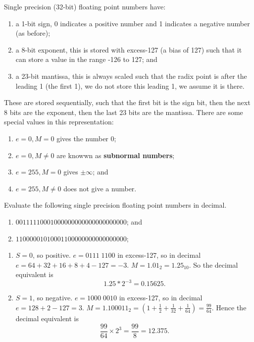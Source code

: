 \begin{definition}
    Single precision (32-bit) floating point numbers have:
    \begin{enumerate}
        \item a 1-bit sign, 0 indicates a positive number and 1 indicates a negative number (as before);
        \item a 8-bit exponent, this is stored with excess-127 (a bias of 127) such that it can store a value in the range -126 to 127; and
        \item a 23-bit mantissa, this is always scaled such that the radix point is after the leading 1 (the first 1), we do not store this leading 1, we assume it is there.
    \end{enumerate}
    These are stored sequentially, such that the first bit is the sign bit, then the next 8 bits are the exponent, then the last 23 bits are the mantissa. There are some special values in this representation:
    \begin{enumerate}
        \item $e = 0, M = 0$ gives the number 0;
        \item $e = 0, M \neq 0$ are knowwn as \textbf{subnormal numbers};
        \item $e = 255, M = 0$ gives $\pm \infty$; and
        \item $e = 255, M \neq 0$ does not give a number.
    \end{enumerate}
\end{definition}

\begin{example}
    Evaluate the following single precision floating point numbers in decimal.
    \begin{enumerate}
        \item $00111110001000000000000000000000$; and
        \item $11000001010001100000000000000000$;
    \end{enumerate}
\end{example}

\begin{solution}
    \begin{enumerate}
        \item $S = 0$, so positive. $e = 0111 \; 1100$ in excess-127, so in decimal $e = 64 + 32 + 16 + 8 + 4 - 127 = -3$. $M = 1.01_2 = 1.25_{10}$. So the decimal equivalent is \[ 1.25 * 2^{-3} = 0.15625. \]
        \item $S = 1$, so negative. $e = 1000 \; 0010$ in excess-127, so in decimal $e = 128 + 2 - 127 = 3$. $M = 1.100011_2 = \left( 1 + \frac12 + \frac1{32} + \frac1{64} \right) = \frac{99}{64}$. Hence the decimal equivalent is \[ \frac{99}{64} \times 2^3 = \frac{99}{8} = 12.375. \]
    \end{enumerate}
\end{solution}
